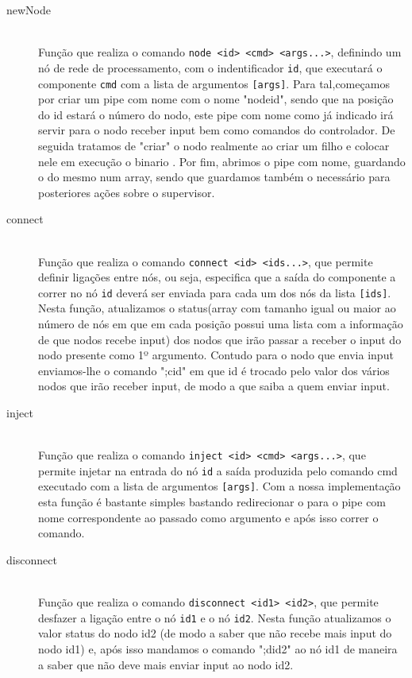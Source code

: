 \documentclass[12pt]{article}
\begin{document}
\begin{description} 
\item[newNode] \hfill \\
    Função que realiza o comando \texttt{node <id> <cmd> <args...>}, definindo um nó de rede de processamento, com o indentificador  \texttt{id}, que executará o componente \texttt{cmd} com a lista de argumentos \texttt{[args]}. Para tal,começamos por criar um pipe com nome com o nome "nodeid", sendo que na posição do id estará o número do nodo, este pipe com nome como já indicado irá servir para o nodo receber input bem como comandos do controlador. De seguida tratamos de "criar" o nodo realmente ao criar um filho e colocar nele em execução o binario . Por fim, abrimos o pipe com nome, guardando o  do mesmo num array, sendo que guardamos também o  necessário para posteriores ações sobre o supervisor.

\item[connect] \hfill \\
    Função que realiza o comando \texttt{connect <id> <ids...>}, que permite definir ligações entre nós, ou seja, especifica que a saída do componente a correr no nó \texttt{id} deverá ser enviada para cada um dos nós da lista \texttt{[ids]}. Nesta função, atualizamos o status(array com tamanho igual ou maior ao número de nós em que em cada posição possui uma lista com a informação de que nodos recebe input) dos nodos que irão passar a receber o input do nodo presente como 1º argumento. Contudo para o nodo que envia input enviamos-lhe o comando ";cid" em que id é trocado pelo valor dos vários nodos que irão receber input, de modo a que saiba a quem enviar input.

\item[inject] \hfill \\
    Função que realiza o comando \texttt{inject <id> <cmd> <args...>}, que permite injetar na entrada do nó \texttt{id} a saída produzida pelo comando cmd executado com a lista de argumentos \texttt{[args]}. Com a nossa implementação esta função é bastante simples bastando redirecionar o  para o pipe com nome correspondente ao passado como argumento e após isso correr o comando. 

\item[disconnect] \hfill \\
    Função que realiza o comando \texttt{disconnect <id1> <id2>}, que permite desfazer a ligação entre o nó \texttt{id1} e o nó \texttt{id2}. Nesta função atualizamos o valor status do nodo id2 (de modo a saber que não recebe mais input do nodo id1) e, após isso mandamos o comando ";did2" ao nó id1 de maneira a saber que não deve mais enviar input ao nodo id2. 


\end{description}
\end{document}
